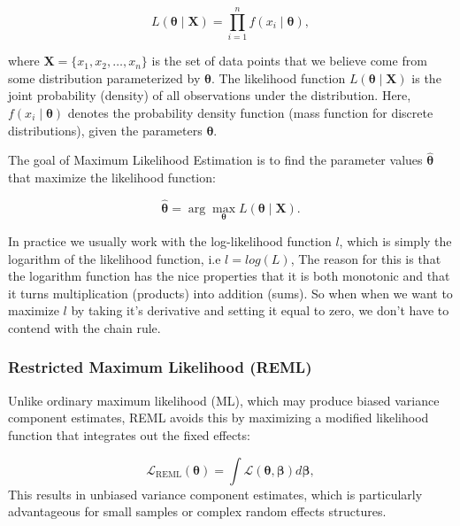 \documentclass[12pt, twoside,hidelinks]{article}
\theoremstyle{definition}
\numberwithin{equation}{section}
\begin{document}
\begin{equation}
L(\boldsymbol{\theta} \mid \mathbf{X}) = \prod_{i=1}^{n} f(x_i \mid \boldsymbol{\theta}),
\end{equation}

where \(\mathbf{X} = \{x_1, x_2, \ldots, x_n\}\) is the set of data points that we believe come from some distribution parameterized by \(\boldsymbol{\theta}\). The likelihood function \(L(\boldsymbol{\theta} \mid \mathbf{X})\) is the joint probability (density) of all observations under the distribution. Here, \(f(x_i \mid \boldsymbol{\theta})\) denotes the probability density function (mass function for discrete distributions), given the parameters \(\boldsymbol{\theta}\).

The goal of Maximum Likelihood Estimation is to find the parameter values \(\boldsymbol{\hat{\theta}}\) that maximize the likelihood function:

\begin{equation}
\boldsymbol{\hat{\theta}} = \arg \max_{\boldsymbol{\theta}} L(\boldsymbol{\theta} \mid \mathbf{X}).
\end{equation}

In practice we usually work with the log-likelihood  function $l$, which is simply the logarithm of the likelihood function, i.e $l = log(L)$, The reason for this is that the logarithm function has the nice properties that it is both monotonic and that it turns multiplication (products) into addition (sums). So when when we want to maximize $l$ by taking it's derivative and setting it equal to zero, we don't have to contend with the chain rule. 


\subsubsection{Restricted Maximum Likelihood (REML)}\label{sec:regmod:linmixmod:reml}

Unlike ordinary maximum likelihood (ML), which may produce biased variance component estimates, REML avoids this by maximizing a modified likelihood function that integrates out the fixed effects:

\begin{equation}
\mathcal{L}_{\text{REML}}(\boldsymbol{\theta}) = \int \mathcal{L}(\boldsymbol{\theta}, \boldsymbol{\beta}) d\boldsymbol{\beta},
\label{eq:reml_likelihood}
\end{equation}
This results in unbiased variance component estimates, which is particularly advantageous for small samples or complex random effects structures. 
\end{document}
